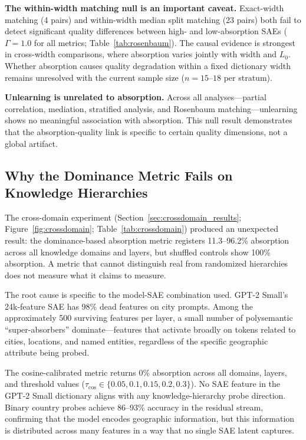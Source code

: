 \documentclass{article}
\begin{document}
\textbf{The within-width matching null is an important caveat.}
Exact-width matching (4 pairs) and within-width median split matching (23 pairs) both fail to detect significant quality differences between high- and low-absorption SAEs ($\Gamma = 1.0$ for all metrics; Table~\ref{tab:rosenbaum}).
The causal evidence is strongest in cross-width comparisons, where absorption varies jointly with width and $L_0$.
Whether absorption causes quality degradation within a fixed dictionary width remains unresolved with the current sample size ($n = 15$--$18$ per stratum).

\textbf{Unlearning is unrelated to absorption.}
Across all analyses---partial correlation, mediation, stratified analysis, and Rosenbaum matching---unlearning shows no meaningful association with absorption.
This null result demonstrates that the absorption-quality link is specific to certain quality dimensions, not a global artifact.

\subsection{Why the Dominance Metric Fails on Knowledge Hierarchies}

The cross-domain experiment (Section~\ref{sec:crossdomain_results}; Figure~\ref{fig:crossdomain}; Table~\ref{tab:crossdomain}) produced an unexpected result: the dominance-based absorption metric registers 11.3--96.2\% absorption across all knowledge domains and layers, but shuffled controls show 100\% absorption.
A metric that cannot distinguish real from randomized hierarchies does not measure what it claims to measure.

The root cause is specific to the model-SAE combination used.
GPT-2 Small's 24k-feature SAE has 98\% dead features on city prompts.
Among the approximately 500 surviving features per layer, a small number of polysemantic ``super-absorbers'' dominate---features that activate broadly on tokens related to cities, locations, and named entities, regardless of the specific geographic attribute being probed.

The cosine-calibrated metric returns 0\% absorption across all domains, layers, and threshold values ($\tau_{\text{cos}} \in \{0.05, 0.1, 0.15, 0.2, 0.3\}$).
No SAE feature in the GPT-2 Small dictionary aligns with any knowledge-hierarchy probe direction.
Binary country probes achieve 86--93\% accuracy in the residual stream, confirming that the model encodes geographic information, but this information is distributed across many features in a way that no single SAE latent captures.
\end{document}
